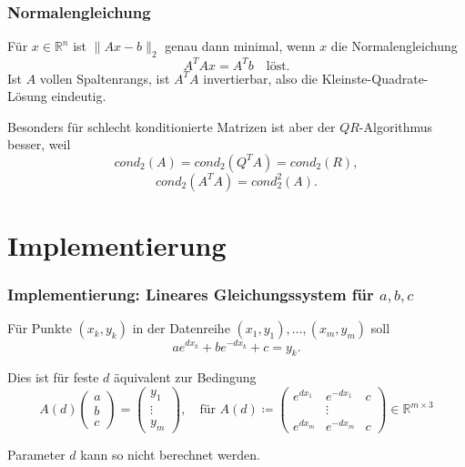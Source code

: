 \documentclass[a4paper, 11pt]{beamer}
\begin{document}
\begin{frame}
    \frametitle{Normalengleichung}

    Für $x \in \mathbb{R}^n$ ist $\|Ax-b\|_2$ genau dann minimal, wenn $x$ die Normalengleichung
    $$A^T A x = A^T b \quad \text{löst.}$$
    Ist $A$ vollen Spaltenrangs, ist $A^T A$ invertierbar, also die Kleinste-Quadrate-Lösung eindeutig.

    \vspace{0.25cm}

    Besonders für schlecht konditionierte Matrizen ist aber der $QR$-Algorithmus besser, weil
    $$ cond_2(A) = cond_2(Q^T A) = cond_2(R), $$
    $$ cond_2(A^T A) = cond_2^2(A).$$

\end{frame}




\section{Implementierung}
\newcommand{\x}{\left( \begin{array}{c} x_1\\ \vdots \\x_m \end{array} \right)}
\newcommand{\y}{\left( \begin{array}{c} y_1\\ \vdots \\y_m \end{array} \right)}
\newcommand{\A}{\left( \begin{array}{ccc} e^{dx_1} & e^{-dx_1} & c \\
    &\vdots \\
    e^{dx_m} & e^{-dx_m} & c \end{array} \right)}
\newcommand{\abc}{\left( \begin{array}{c} a \\ b \\ c \end{array} \right)}

\begin{frame}
    \frametitle{Implementierung: Lineares Gleichungssystem für $a,b,c$}

    Für Punkte $(x_k,y_k)$ in der Datenreihe $(x_1, y_1), \hdots, (x_m, y_m)$ soll
    $$ ae^{dx_k} + be^{-dx_k} +c = y_k. $$
    
    Dies ist für feste $d$ äquivalent zur Bedingung
    $$ A(d) \abc = \y, \quad \text{für } A(d) \coloneqq \A \in \mathbb{R}^{m \times 3}$$

    \vspace{\baselineskip}
    Parameter $d$ kann so nicht berechnet werden.

\end{frame}
\end{document}
